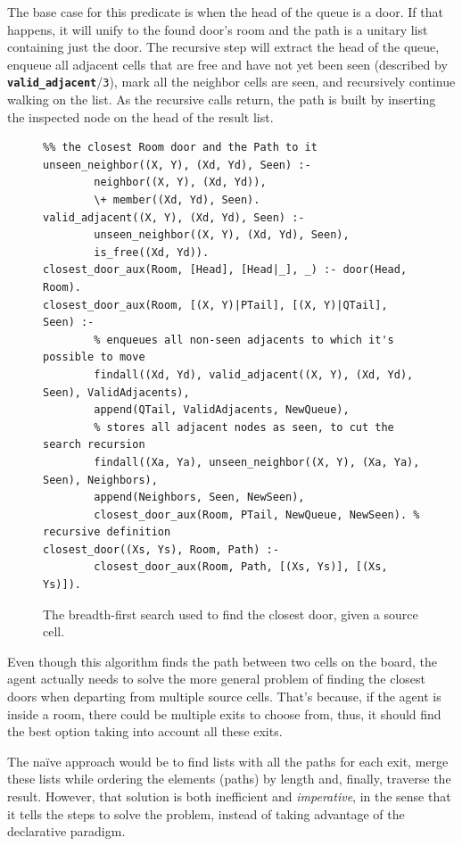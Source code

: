 \documentclass[12pt,a4paper]{article}
\newcommand{\varname}[1]{\texttt{#1}}
\newcommand{\varnamebf}[1]{\textbf{\texttt{#1}}}
\newcommand{\predprot}[2]{{\color{MidnightBlue}\varnamebf{#1}}/{\color{Mulberry}\varname{#2}}}
\begin{document}
The base case for this predicate is when the head of the queue is a door. If that happens, it will unify to the found door's room and the path is a unitary list containing just the door. The recursive step will extract the head of the queue, enqueue all adjacent cells that are free and have not yet been seen (described by \predprot{valid\_adjacent}{3}), mark all the neighbor cells are seen, and recursively continue walking on the list. As the recursive calls return, the path is built by inserting the inspected node on the head of the result list.

\begin{figure}[H]
	\centering
\begin{lstlisting}[style=Prolog-pygsty]
%% closest_door((Xs, Ys), Room, Path) - starting at <Xs, Ys>, finds
%% the closest Room door and the Path to it
unseen_neighbor((X, Y), (Xd, Yd), Seen) :-
		neighbor((X, Y), (Xd, Yd)),
		\+ member((Xd, Yd), Seen).
valid_adjacent((X, Y), (Xd, Yd), Seen) :-
		unseen_neighbor((X, Y), (Xd, Yd), Seen),
		is_free((Xd, Yd)).
closest_door_aux(Room, [Head], [Head|_], _) :- door(Head, Room).
closest_door_aux(Room, [(X, Y)|PTail], [(X, Y)|QTail], Seen) :-
		% enqueues all non-seen adjacents to which it's possible to move
		findall((Xd, Yd), valid_adjacent((X, Y), (Xd, Yd), Seen), ValidAdjacents),
		append(QTail, ValidAdjacents, NewQueue),
		% stores all adjacent nodes as seen, to cut the search recursion
		findall((Xa, Ya), unseen_neighbor((X, Y), (Xa, Ya), Seen), Neighbors),
		append(Neighbors, Seen, NewSeen),
		closest_door_aux(Room, PTail, NewQueue, NewSeen). % recursive definition
closest_door((Xs, Ys), Room, Path) :-
		closest_door_aux(Room, Path, [(Xs, Ys)], [(Xs, Ys)]).
\end{lstlisting}
	\caption{The breadth-first search used to find the closest door, given a source cell.} 
	\label{fig:bfs}
\end{figure}

Even though this algorithm finds the path between two cells on the board, the agent actually needs to solve the more general problem of finding the closest doors when departing from multiple source cells. That's because, if the agent is inside a room, there could be multiple exits to choose from, thus, it should find the best option taking into account all these exits.

The na\"{i}ve approach would be to find lists with all the paths for each exit, merge these lists while ordering the elements (paths) by length and, finally, traverse the result. However, that solution is both inefficient and \textit{imperative}, in the sense that it tells the steps to solve the problem, instead of taking advantage of the declarative paradigm.
\end{document}
